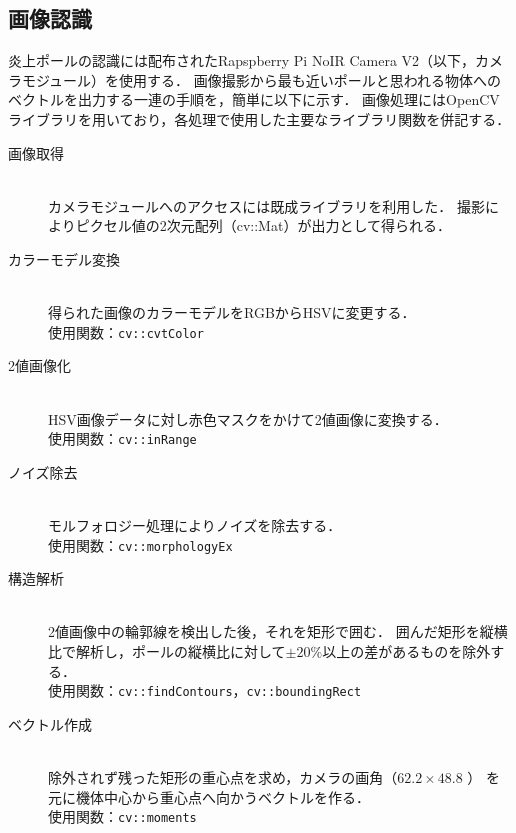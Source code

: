 \documentclass[11pt,a4paper]{jsarticle}
\begin{document}
\subsection{画像認識}
  炎上ポールの認識には配布されたRapspberry Pi NoIR Camera V2（以下，カメラモジュール）を使用する．
  画像撮影から最も近いポールと思われる物体へのベクトルを出力する一連の手順を，簡単に以下に示す．
  画像処理にはOpenCVライブラリを用いており，各処理で使用した主要なライブラリ関数を併記する．

  \begin{description}

    \item[画像取得] \mbox{} \\
      カメラモジュールへのアクセスには既成ライブラリ\cite{raspicam}を利用した．
      撮影によりピクセル値の2次元配列（cv::Mat）が出力として得られる．\\

    \item[カラーモデル変換] \mbox{} \\
      得られた画像のカラーモデルをRGBからHSVに変更する．\\
      使用関数：\texttt{cv::cvtColor} \\

    \item[2値画像化] \mbox{} \\
      HSV画像データに対し赤色マスクをかけて2値画像に変換する．\\
      使用関数：\texttt{cv::inRange} \\

    \item[ノイズ除去] \mbox{} \\
      モルフォロジー処理によりノイズを除去する．\\
      使用関数：\texttt{cv::morphologyEx} \\

    \item[構造解析] \mbox{} \\
      2値画像中の輪郭線を検出した後，それを矩形で囲む．
      囲んだ矩形を縦横比で解析し，ポールの縦横比に対して$\pm 20 \%$以上の差があるものを除外する．\\
      使用関数：\texttt{cv::findContours}，\texttt{cv::boundingRect} \\

    \item[ベクトル作成] \mbox{} \\
      除外されず残った矩形の重心点を求め，カメラの画角（$62.2 \times 48.8$ \cite{elinux}）
      を元に機体中心から重心点へ向かうベクトルを作る．\\
      使用関数：\texttt{cv::moments} \\

  \end{description}
\end{document}

